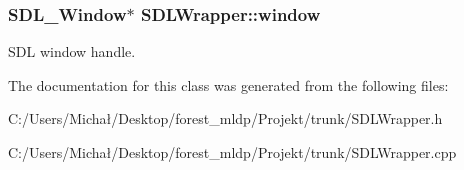 \subsubsection[{\texorpdfstring{window}{window}}]{\setlength{\rightskip}{0pt plus 5cm}S\+D\+L\+\_\+\+Window$\ast$ S\+D\+L\+Wrapper\+::window}\hypertarget{class_s_d_l_wrapper_a04523181eb3d33d40468dd428def4518}{}\label{class_s_d_l_wrapper_a04523181eb3d33d40468dd428def4518}
S\+DL window handle. 

The documentation for this class was generated from the following files\+:\begin{DoxyCompactItemize}
\item 
C\+:/\+Users/\+Michał/\+Desktop/forest\+\_\+mldp/\+Projekt/trunk/S\+D\+L\+Wrapper.\+h\item 
C\+:/\+Users/\+Michał/\+Desktop/forest\+\_\+mldp/\+Projekt/trunk/S\+D\+L\+Wrapper.\+cpp\end{DoxyCompactItemize}
